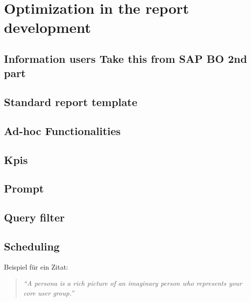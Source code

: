 \section{Optimization in the report development}
\subsection{Information users Take this from SAP BO 2nd part}
\subsection{Standard report template}
\subsection{Ad-hoc Functionalities}
\subsection{Kpis}
\subsection{Prompt}
\subsection{Query filter}
\subsection{Scheduling}
Beispiel für ein Zitat:
\begin{quotation}
	\textit{\enquote{A persona is a rich picture of an imaginary person who represents your core user group.}} \cite{Dix04}
\end{quotation}





